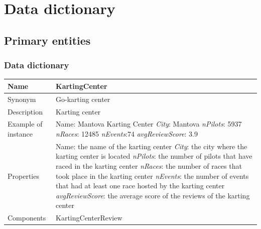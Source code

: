\documentclass{beamer}
\begin{document}



\section*{Data dictionary}

\subsection*{Primary entities}

\begin{frame}
\frametitle{Data dictionary}


\begin{table}
\tiny
\begin{tabular}{|p{2cm}|p{6cm}|}
\hline
Name & \textbf{KartingCenter} \\
\hline
Synonym & Go-karting center \\
\hline
Description & Karting center \\
\hline
Example of instance & 
Name: Mantova Karting Center \newline
\textit{City}: Mantova \newline
\textit{nPilots}: 5937 \newline
\textit{nRaces}: 12485 \newline
\textit{nEvents}:74 \newline
\textit{avgReviewScore}: 3.9 \\
\hline
Properties & 
Name: the name of the karting center\newline
\textit{City}: the city where the karting center is located\newline
\textit{nPilots}: the number of pilots that have raced in the karting center \newline
\textit{nRaces}: the number of races that took place in the karting center \newline
\textit{nEvents}: the number of events that had at least one race hosted by the karting center \newline
\textit{avgReviewScore}: the average score of the reviews of the karting center \\
\hline
Components & KartingCenterReview \\
\hline
\end{tabular}
\end{table}

\end{frame}
\end{document}
